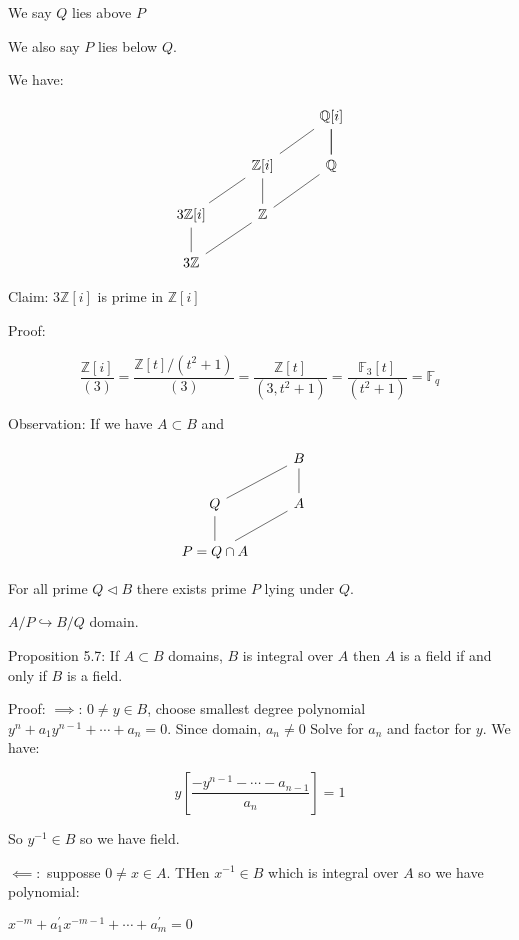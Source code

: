 \documentclass{article}
\theoremstyle{definition}
\begin{document}
We say \(Q\) lies above \(P\)

We also say \(P\) lies below \(Q\).

We have:

\[
    \begin{tikzcd}
        & & \mathbb{Q} [i]\ar[d, no head]\\
        & \mathbb{Z} \ar[ur, no head] [i] & \mathbb{Q} \ar[u, no head] \\
        3\mathbb{Z}[i] \ar[ur, no head] & \mathbb{Z} \ar[ur, no head] \ar[u, no head] & \\
        3\mathbb{Z} \ar[u, no head] \ar[ur, no head] & &
    \end{tikzcd}
\]

Claim: \(3\mathbb{Z} [i]\) is prime in \(\mathbb{Z} [i]\)  

Proof:

\[
    \frac{\mathbb{Z} [i]}{(3)} = \frac{\mathbb{Z} [t] / (t^2 + 1)}{(3)} = \frac{\mathbb{Z} [t]}{(3,t^2 + 1)} = \frac{\mathbb{F}_3 [t]}{(t^2 + 1)} = \mathbb{F}_q
\]

Observation: If we have \(A \subset B\) and

\[
    \begin{tikzcd}
        & B \ar[d,no head]\\
        Q \ar[d, no head] \ar[ur, no head] & A\\
        P = Q\cap A \ar[ur, no head] & &
    \end{tikzcd}
\]

For all prime \(Q \triangleleft B\) there exists prime \(P\) lying under \(Q\).

\(A / P \hookrightarrow B / Q\) domain. 

Proposition 5.7: If \(A \subset B\) domains, \(B\) is integral over \(A\) then \(A\) is a field if and only if \(B\) is a field.

Proof: \(\implies\): \(0\neq y\in B\), choose smallest degree polynomial \(y^n + a_1 y^{n-1} + \cdots + a_n = 0\). Since domain, \(a_n\neq 0\) Solve for \(a_n\) and factor for \(y\). We have:

\[
    y \left[ \frac{-y^{n-1}-\cdots-a_{n-1}}{a_n} \right] = 1
\]

So \(y ^{-1}  \in B\) so we have field. 

\(\impliedby :\) supposse \(0\neq x\in A\). THen \(x ^{-1} \in B\) which is integral over \(A\) so we have polynomial:

\(x ^{-m} + a_1^{\prime} x^{-m-1} + \cdots + a_m^{\prime} = 0 \) 
\end{document}
